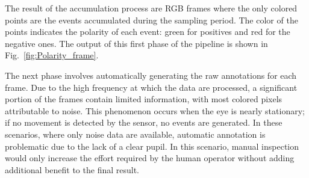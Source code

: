 The result of the accumulation process are RGB frames where the only colored points are the events accumulated during the sampling period. The color of the points indicates the polarity of each event: green for positives and red for the negative ones. The output of this first phase of the pipeline is shown in Fig.~\ref{fig:Polarity_frame}. 


The next phase involves automatically generating the raw annotations for each frame. Due to the high frequency at which the data are processed, a significant portion of the frames contain limited information, with most colored pixels attributable to noise. This phenomenon occurs when the eye is nearly stationary; if no movement is detected by the sensor, no events are generated. In these scenarios, where only noise data are available, automatic annotation is problematic due to the lack of a clear pupil. In this scenario, manual inspection would only increase the effort required by the human operator without adding additional benefit to the final result.






